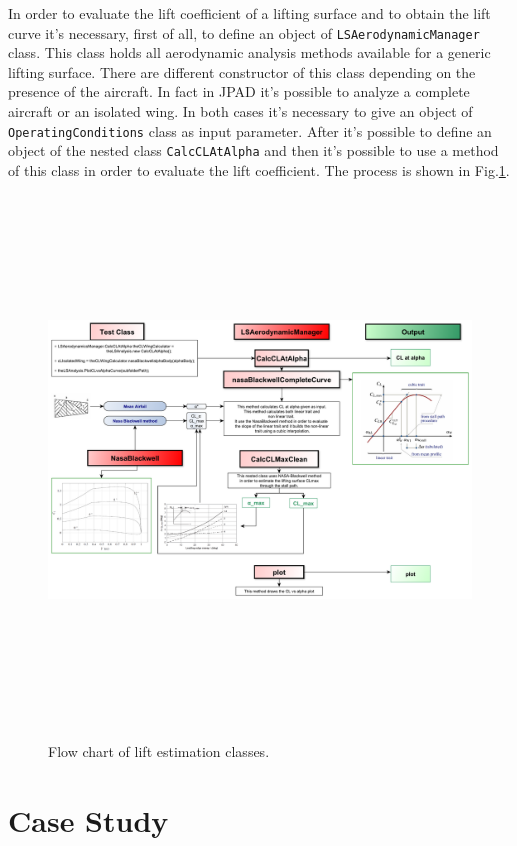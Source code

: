 In order to evaluate the lift coefficient of a lifting surface and to obtain the lift curve it's necessary, first of all, to define an object of \texttt{LSAerodynamicManager} class. This class holds all aerodynamic analysis methods available for a generic lifting surface. There are different constructor of this class depending on the presence of the aircraft. In fact in JPAD it's possible to analyze a complete aircraft or an isolated wing. In both cases it's necessary to give an object of \texttt{OperatingConditions} class as input parameter. After it's possible to define an object of the nested class \texttt{CalcCLAtAlpha} and then it's possible to use a method of this class in order to evaluate the lift coefficient. The process is shown in Fig.\ref{fig:clalf}.

\begin{figure}[H]
\centering
{\includegraphics[height=14cm, angle=90]{Immagini/clflowchart.pdf}} 
\caption{Flow chart of lift estimation classes.}
\label{fig:clalf}
\end{figure}


\section{Case Study}

